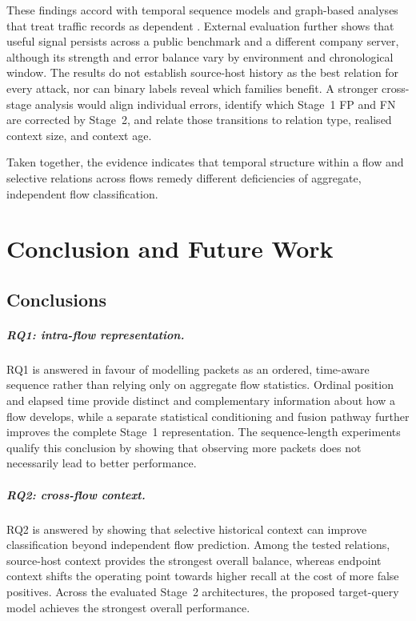 \documentclass[11pt,fleqn]{report}
\begin{document}
These findings accord with temporal sequence models and graph-based analyses that treat traffic records as dependent \cite{LiuPatras2022NetSentry,Deng2023FlowTopology,Xu2024SSLGNN}. External evaluation further shows that useful signal persists across a public benchmark and a different company server, although its strength and error balance vary by environment and chronological window. The results do not establish source-host history as the best relation for every attack, nor can binary labels reveal which families benefit. A stronger cross-stage analysis would align individual errors, identify which Stage~1 FP and FN are corrected by Stage~2, and relate those transitions to relation type, realised context size, and context age.

Taken together, the evidence indicates that temporal structure within a flow and selective relations across flows remedy different deficiencies of aggregate, independent flow classification.

\chapter{Conclusion and Future Work}
\label{sec:conclusion_future_work}

\section{Conclusions}
\label{subsec:conclusion_rq_answers}

\paragraph{RQ1: intra-flow representation.}
RQ1 is answered in favour of modelling packets as an ordered, time-aware sequence rather than relying only on aggregate flow statistics. Ordinal position and elapsed time provide distinct and complementary information about how a flow develops, while a separate statistical conditioning and fusion pathway further improves the complete Stage~1 representation. The sequence-length experiments qualify this conclusion by showing that observing more packets does not necessarily lead to better performance.

\paragraph{RQ2: cross-flow context.}
RQ2 is answered by showing that selective historical context can improve classification beyond independent flow prediction. Among the tested relations, source-host context provides the strongest overall balance, whereas endpoint context shifts the operating point towards higher recall at the cost of more false positives. Across the evaluated Stage~2 architectures, the proposed target-query model achieves the strongest overall performance.
\end{document}

